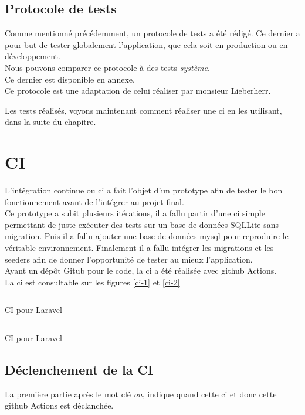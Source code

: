 \documentclass[
    iai, %
    il, %
]{heig-tb}
\begin{document}
\subsection{Protocole de tests}
Comme mentionné précédemment, un protocole de tests a été rédigé. Ce dernier a pour but de tester globalement l'application, que cela soit en production ou en développement. \\
Nous pouvons comparer ce protocole à des tests \emph{système}. \\
Ce dernier est disponible en annexe. \\
Ce protocole est une adaptation de celui réaliser par monsieur Lieberherr.

Les tests réalisés, voyons maintenant comment réaliser une \Gls{ci} en les utilisant, dans la suite du chapitre.

\section{CI}

L'intégration continue ou \Gls{ci} a fait l'objet d'un prototype afin de tester le bon fonctionnement
avant de l'intégrer au projet final.\\
Ce prototype a subit plusieurs itérations, il a fallu partir d'une \Gls{ci} simple permettant de juste
exécuter des tests sur un base de données SQLLite sans migration. Puis il a fallu ajouter une base
de données \Gls{mysql} pour reproduire le véritable environnement. Finalement il a fallu intégrer les
migrations et les seeders afin de donner l'opportunité de tester au mieux l'application.\\
Ayant un dépôt Gitub pour le code, la \Gls{ci} a été réalisée avec \Gls{github} Actions.\\
La \Gls{ci} est consultable sur les figures \ref{ci-1} et \ref{ci-2}

\begin{listing}[h]
    \inputminted{yaml}{assets/code/ci-1.yml}
    \caption{CI pour Laravel \label{ci-1}}
\end{listing}

\begin{listing}[h]
    \inputminted{yaml}{assets/code/ci-2.yml}
    \caption{CI pour Laravel \label{ci-2}}
\end{listing}

\subsection{Déclenchement de la CI}
La première partie après le mot clé \emph{on}, indique quand cette \Gls{ci} et donc cette \Gls{github} Actions est déclanchée.
\end{document}
